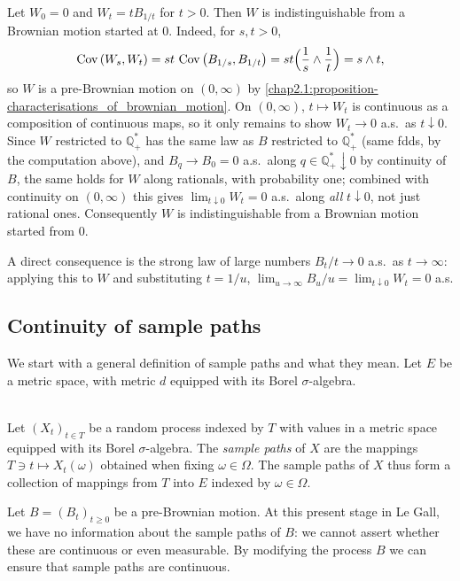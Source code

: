\begin{remark} \label{chap2.1:remark-time_inversion}  \\
Let $W_0=0$ and $W_t=tB_{1/t}$ for $t>0$. Then $W$ is indistinguishable from a Brownian motion started at $0$. Indeed, for $s,t>0$,
$$\operatorname{Cov}\left(W_s, W_t\right)=st\,\operatorname{Cov}\left(B_{1/s}, B_{1/t}\right)=st\Big(\frac1s\wedge\frac1t\Big)=s\wedge t,$$
so $W$ is a pre-Brownian motion on $(0,\infty)$ by \cref{chap2.1:proposition-characterisations_of_brownian_motion}. On $(0,\infty)$, $t\mapsto W_t$ is continuous as a composition of continuous maps, so it only remains to show $W_t\to0$ a.s.\ as $t\downarrow0$. Since $W$ restricted to $\mathbb Q_+^*$ has the same law as $B$ restricted to $\mathbb Q_+^*$ (same fdds, by the computation above), and $B_q\to B_0=0$ a.s.\ along $q\in\mathbb Q_+^*\downarrow0$ by continuity of $B$, the same holds for $W$ along rationals, with probability one; combined with continuity on $(0,\infty)$ this gives $\lim_{t\downarrow0}W_t=0$ a.s.\ along \emph{all} $t\downarrow0$, not just rational ones. Consequently $W$ is indistinguishable from a Brownian motion started from $0$.

A direct consequence is the strong law of large numbers $B_t/t\to0$ a.s.\ as $t\to\infty$: applying this to $W$ and substituting $t=1/u$, $\lim_{u\to\infty}B_u/u=\lim_{t\downarrow0}W_t=0$ a.s.
\end{remark}

\subsection{Continuity of sample paths}
We start with a general definition of sample paths and what they mean. Let $E$ be a metric space, with metric $d$ equipped with its Borel $\sigma$-algebra.
\begin{definition}\label{chap2.2:definition-sample_paths_of_process}
 \\
Let $(X_t)_{t \in T}$ be a random process indexed by $T$ with values in a metric space equipped with its Borel $\sigma$-algebra. The \textit{sample paths} of $X$ are the mappings $T \ni t \mapsto X_t(\omega)$ obtained when fixing $\omega \in \Omega$. The sample paths of $X$ thus form a collection of mappings from $T$ into $E$ indexed by $\omega \in \Omega$.    
\end{definition}
Let $B=(B_t)_{t \geq 0}$ be a pre-Brownian motion. At this present stage in Le Gall, we have no information about the sample paths of $B$: we cannot assert whether these are continuous or even measurable. By modifying the process $B$ we can ensure that sample paths are continuous.

